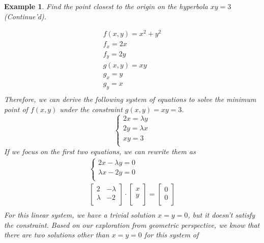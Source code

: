 \documentclass{article}
\newtheorem{example}{Example}
\begin{document}
\begin{example}
  Find the point closest to the origin on the hyperbola $xy = 3$ (Continue'd).

  \begin{gather*}
    f(x, y) = x^2 + y^2 \\
    f_x = 2x \\
    f_y = 2y \\
    g(x, y) = xy \\
    g_x = y \\
    g_y = x \\
  \end{gather*}
  Therefore, we can derive the following system of equations to solve the 
  minimum point of $f(x, y)$ under the constraint $g(x, y) = xy = 3$.
  \begin{equation*}
    \begin{cases}
      2x = \lambda y \\
      2y = \lambda x \\
      xy = 3 \\
    \end{cases}
  \end{equation*}
  If we focus on the first two equations, we can rewrite them as
  \begin{gather*}
    \begin{cases}
      2x - \lambda y = 0 \\
      \lambda x - 2y = 0 \\
    \end{cases} \\
    \begin{bmatrix}
      2 & -\lambda \\
      \lambda & -2 \\
    \end{bmatrix} \cdot
    \begin{bmatrix}
      x \\
      y \\
    \end{bmatrix} = 
    \begin{bmatrix}
      0 \\
      0 \\
    \end{bmatrix} \\
  \end{gather*}
  For this linear system, we have a trivial solution $x = y = 0$, but it doesn't 
  satisfy the constraint. Based on our exploration from geometric perspective, 
  we know that there are two solutions other than $x = y = 0$ for this system of 

\end{example}
\end{document}
